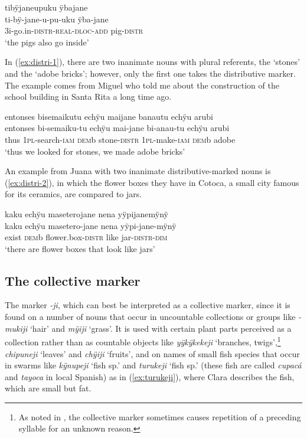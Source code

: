 \ea\label{ex:distri-3}
\begingl
\glpreamble tibÿjaneupuku ÿbajane\\
\gla ti-bÿ-jane-u-pu-uku ÿba-jane\\
\glb 3i-go.in-\textsc{distr}-\textsc{real}-\textsc{dloc}-\textsc{add} pig-\textsc{distr}\\
\glft ‘the pigs also go inside’
\endgl
\trailingcitation{[mrx-e150219s.102]}
\xe

In (\ref{ex:distri-1}), there are two inanimate nouns with plural referents, the ‘stones’ and the ‘adobe bricks’; however, only the first one takes the distributive marker. The example comes from Miguel who told me about the construction of the school building in Santa Rita a long time ago.

\ea\label{ex:distri-1}
\begingl
\glpreamble entonses bisemaikutu echÿu maijane banautu echÿu arubi\\
\gla entonses bi-semaiku-tu echÿu mai-jane bi-anau-tu echÿu arubi\\
\glb thus 1\textsc{pl}-search-\textsc{iam} \textsc{dem}b stone-\textsc{distr} 1\textsc{pl}-make-\textsc{iam} \textsc{dem}b adobe\\
\glft ‘thus we looked for stones, we made adobe bricks’
\endgl
\trailingcitation{[mxx-p110825l.114]}
\xe

An example from Juana with two inanimate distributive-marked nouns is (\ref{ex:distri-2}), in which the flower boxes they have in Cotoca, a small city famous for its ceramics, are compared to jars.

\ea\label{ex:distri-2}
\begingl
\glpreamble kaku echÿu maseterojane nena yÿpijanemÿnÿ\\
\gla kaku echÿu masetero-jane nena yÿpi-jane-mÿnÿ\\
\glb exist \textsc{dem}b flower.box-\textsc{distr} like jar-\textsc{distr}-\textsc{dim}\\
\glft ‘there are flower boxes that look like jars'
\endgl
\trailingcitation{[jxx-p120430l-2.616]}
\xe
{}

\subsection{The collective marker}\label{sec:Collective}
The marker \textit{-ji}, which can best be interpreted as a collective marker, since it is found on a number of nouns that occur in uncountable collections or groups like \textit{-mukiji} ‘hair’ and  \textit{mÿiji} ‘grass’. It is used with certain plant parts perceived as a collection rather than as countable objects like \textit{yÿkÿkekeji} ‘branches, twigs’,\footnote{As noted in , the collective marker sometimes causes repetition of a preceding syllable for an unknown reason.} \textit{chipuneji} ‘leaves’ and \textit{chÿiji} ‘fruits’, and on names of small fish species that occur in swarms like \textit{kÿnupeji} ‘fish sp.’ and \textit{turukeji} ‘fish sp.’ (these fish are called \textit{cupacá} and \textit{tayoca} in local Spanish) as in (\ref{ex:turukeji}), where Clara describes the fish, which are small but fat.

